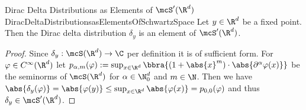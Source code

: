 \begin{mlem}{Dirac Delta Distributions as Elements of $\mcS'(\R^d)$}{DiracDeltaDistributionsasElementsOfSchwartzSpace}
    Let $y\in\R^d$ be a fixed point. Then the Dirac delta distribution $\delta_y$ is an element of $\mcS'(\R^d)$.
\end{mlem}
\begin{proof}
    Since $\delta_y:\mcS(\R^d)\to\C$ per definition it is of sufficient form. For $\varphi\in C^\infty(\R^d)$ let $p_{\alpha,m}(\varphi):=\sup_{x\in\R^d}\bbra{(1 + \abs{x}^m)\cdot\abs{\partial^\alpha\varphi(x)}}$ be the seminorms of $\mcS(\R^d)$ for $\alpha\in\N_0^d$ and $m\in\N$. Then we have $\abs{\delta_y(\varphi)} = \abs{\varphi(y)} \leq \sup_{x\in\R^d}\abs{\varphi(x)} = p_{0,0}(\varphi)$ and thus $\delta_y\in\mcS'(\R^d)$.  
\end{proof}
